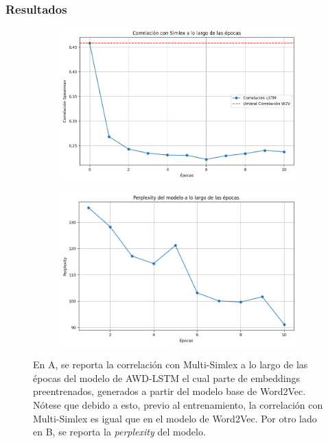 \subsubsection{Resultados}

\begin{figure}[H]
    \centering
    \begin{subfigure}[b]{0.75\textwidth}
        \centering
        \includegraphics[width=1\textwidth]{imagenes/simlex_corr_preembed.png}
        \caption{}
        \label{fig:simlex_corr_preembed.png}
    \end{subfigure}
    \hfill
    \begin{subfigure}[b]{0.75\textwidth}
        \centering
        \includegraphics[width=1\textwidth]{imagenes/perp_preembed.png}
        \caption{}
        \label{fig:perp_preembed.png}
    \end{subfigure}
    \caption{En A, se reporta la correlación con Multi-Simlex a lo largo de las épocas 
    del modelo de AWD-LSTM el cual parte de embeddings preentrenados, generados a 
    partir del modelo base de Word2Vec. Nótese que debido a esto, previo al 
    entrenamiento, la correlación con Multi-Simlex es igual que en el modelo 
    de Word2Vec. Por otro lado en B, se reporta la \textit{perplexity} del modelo.}
    \label{fig:preembed}
\end{figure}

